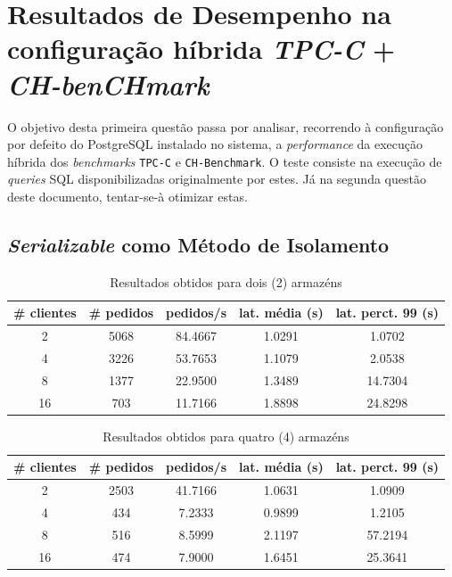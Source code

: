 \section{Resultados de Desempenho na configuração híbrida \textit{TPC-C} + \textit{CH-benCHmark}}

O objetivo desta primeira questão passa por analisar, recorrendo à configuração por defeito do PostgreSQL instalado no sistema, a \textit{performance} da execução híbrida dos \textit{benchmarks} \verb+TPC-C+ e \verb+CH-Benchmark+.
O teste consiste na execução de \textit{queries} SQL disponibilizadas originalmente por estes. Já na segunda questão deste documento, tentar-se-à otimizar estas.

\subsection{\textit{Serializable} como Método de Isolamento}

\begin{table}[!h]
\center
\small
\begin{tabular}{|c|c|c|c|c|}
\hline
\textbf{\# clientes} & \textbf{\# pedidos} & \textbf{pedidos/s} & \textbf{lat. média (s)} & \textbf{lat. perct. 99 (s)}  \\ \hline
2 & 5068 & 84.4667 & 1.0291 & 1.0702  \\ \hline
4 & 3226 & 53.7653 & 1.1079 & 2.0538  \\ \hline
8 & 1377 & 22.9500 & 1.3489 & 14.7304  \\ \hline
16 & 703 & 11.7166 & 1.8898 & 24.8298  \\ \hline
\end{tabular}
\caption{Resultados obtidos para dois (2) armazéns}
\end{table}

\begin{table}[!h]
\center
\small
\begin{tabular}{|c|c|c|c|c|}
\hline
\textbf{\# clientes} & \textbf{\# pedidos} & \textbf{pedidos/s} & \textbf{lat. média (s)} & \textbf{lat. perct. 99 (s)}  \\ \hline
2 & 2503 & 41.7166 & 1.0631 & 1.0909  \\ \hline
4 & 434 & 7.2333 & 0.9899 & 1.2105  \\ \hline
8 & 516 & 8.5999 & 2.1197 & 57.2194  \\ \hline
16 & 474 & 7.9000 & 1.6451 & 25.3641  \\ \hline
\end{tabular}
\caption{Resultados obtidos para quatro (4) armazéns}
\end{table}


